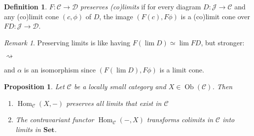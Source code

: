 \documentclass{article}
\newcommand{\cat}{\mathcal{C}}
\newcommand{\catt}{\mathcal{D}}
\newcommand{\Jcat}{\mathcal{J}}
\newcommand{\Set}{\mathbf{Set}}
\DeclareMathOperator{\Ob}{Ob}
\DeclareMathOperator{\Hom}{Hom}
\theoremstyle{plain}
\newtheorem{proposition}[theorem]{Proposition}
\theoremstyle{definition}
\newtheorem{definition}[theorem]{Definition}
\theoremstyle{remark}
\newtheorem*{remark}{Remark}
\begin{document}
\begin{definition}
    $F : \cat \to \catt$ \emph{preserves (co)limits} if for every diagram $D : \Jcat \to \cat$ and any (co)limit cone $(c,\phi)$ of $D$, the image $(F(c),F\phi)$ is a (co)limit cone over $FD : \Jcat \to \catt$.
\end{definition}

\begin{remark}
    Preserving limits is like having $F(\lim D) \simeq \lim FD$, but stronger:
    \begin{center}
        \hspace{2em}$\rightsquigarrow$\hspace{2em}
    \end{center}
    and $\alpha$ is an isomorphism since $(F(\lim D), F\phi)$ is a limit cone.
\end{remark}

\begin{proposition}
    Let $\cat$ be a locally small category and $X \in \Ob(\cat)$. Then
    \begin{enumerate}
        \item $\Hom_\cat (X,-)$ preserves all limits that exist in $\cat$
        \item The contravariant functor $\Hom_\cat(-,X)$ transforms colimits in $\cat$ into limits in $\Set$.
    \end{enumerate}
\end{proposition}
\end{document}

